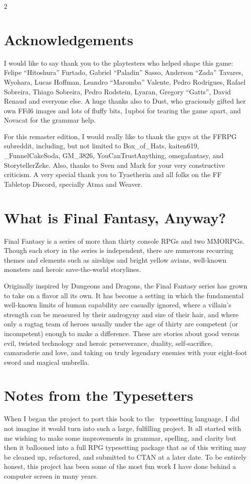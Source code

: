 \begin{multicols}{2}
\section{Acknowledgements}\label{sec:acknowledgements}
I would like to say thank you to the playtesters who helped shape this game: Felipe “Hitoshura” Furtado, Gabriel “Paladin” Sasso, Anderson “Zada” Tavares, Wyohara, Lucas Hoffman, Leandro “Maromba” Valente, Pedro Rodrigues, Rafael Sobreira, Thiago Sobreira, Pedro Rodstein, Lyaran, Gregory “Gatts”, David Renaud and everyone else. A huge thanks also to Dust, who graciously gifted her own FFd6 images and lots of fluffy bits, 1upboi for tearing the game apart, and Novacat for the grammar help. \pw%

For this remaster edition, I would really like to thank the guys at the FFRPG subreddit, including, but not limited to Box\_of\_Hats, kaiten619, \_FunnelCakeSoda, GM\_3826, YouCanTrustAnything, omegafantasy, and StorytellerZeke. Also, thanks to Sven and Mark for your very constructive criticism. A very special thank you to Tyaetherin and all folks on the FF Tabletop Discord, specially Atma and Weaver.

\section{What is Final Fantasy, Anyway?}\label{sec:whatff}
Final Fantasy is a series of more than thirty console RPGs and two MMORPGs. Though each story in the series is independent, there are numerous recurring themes and elements such as airships and bright yellow avians, well-known monsters and heroic save-the-world storylines.

Originally inspired by Dungeons and Dragons, the Final Fantasy series has grown to take on a flavor all its own. It has become a setting in which the fundamental well-known limits of human capability are casually ignored, where a villain’s strength can be measured by their androgyny and size of their hair, and where only a ragtag team of heroes usually under the age of thirty are competent (or incompetent) enough to make a difference. These are stories about good versus evil, twisted technology and heroic perseverance, duality, self-sacrifice, camaraderie and love, and taking on truly legendary enemies with your eight-foot sword and magical umbrella.

\section{Notes from the Typesetters}\label{sec:forward-typesetting}
When I began the project to port this book to the \XeLaTeX\ typesetting language, I did not imagine it would turn into such a large, fulfilling project. It all started with me wishing to make some improvements in grammar, spelling, and clarity but then it ballooned into a full RPG typesetting package that as of this writing may be cleaned up, refactored, and submitted to CTAN at a later date. To be entirely honest, this project has been some of the most fun work I have done behind a computer screen in many years.\pc%


\end{multicols}
